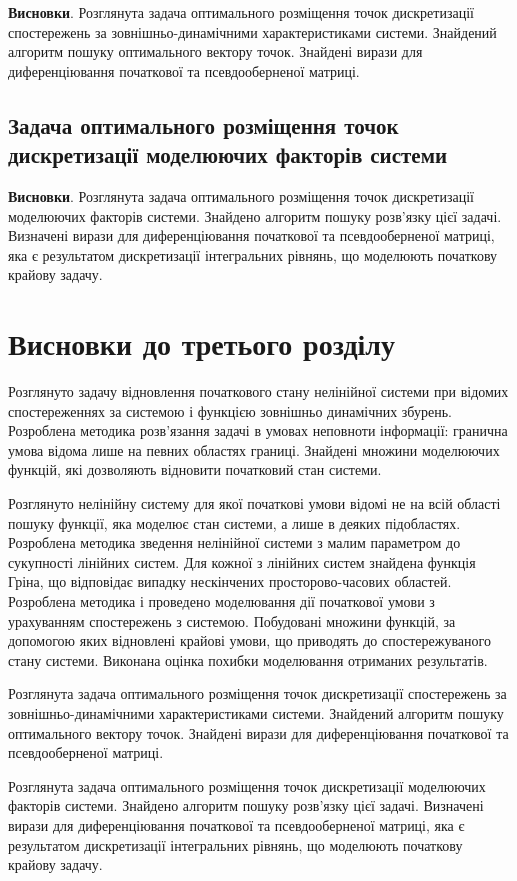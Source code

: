 \textbf{Висновки}. Розглянута задача оптимального розміщення  точок дискретизації спостережень за
зовнішньо-динамічними характеристиками системи. Знайдений алгоритм пошуку оптимального вектору точок.
Знайдені вирази для диференціювання початкової та псевдооберненої матриці.

\subsection{Задача оптимального розміщення  точок дискретизації моделюючих факторів системи} \label{sect3_2_2}

\textbf{Висновки}. Розглянута задача оптимального розміщення точок дискретизації моделюючих факторів системи.
Знайдено алгоритм пошуку розв’язку цієї задачі. Визначені вирази для диференціювання початкової та
псевдооберненої матриці, яка є результатом дискретизації інтегральних рівнянь, що моделюють початкову крайову задачу.

\section*{Висновки до третього розділу}

Розглянуто задачу відновлення початкового стану нелінійної системи при відомих спостереженнях за системою і функцією
зовнішньо динамічних збурень. Розроблена методика розв’язання задачі в умовах неповноти інформації: гранична умова
відома лише на певних областях границі. Знайдені множини моделюючих функцій, які дозволяють відновити початковий
стан системи.

Розглянуто нелінійну систему для якої початкові умови відомі не на всій області пошуку функції, яка моделює стан
системи, а лише в деяких підобластях. Розроблена методика зведення нелінійної системи з малим параметром до
сукупності лінійних систем. Для кожної з лінійних систем знайдена функція Гріна, що відповідає випадку нескінчених
просторово-часових областей. Розроблена методика і проведено моделювання дії початкової умови з урахуванням
спостережень з системою. Побудовані множини функцій, за допомогою яких відновлені крайові умови, що приводять
до спостережуваного стану системи. Виконана оцінка похибки моделювання отриманих результатів.

Розглянута задача оптимального розміщення  точок дискретизації спостережень за зовнішньо-динамічними характеристиками
системи. Знайдений алгоритм пошуку оптимального вектору точок. Знайдені вирази для диференціювання початкової та
псевдооберненої матриці.

Розглянута задача оптимального розміщення  точок дискретизації моделюючих факторів системи. Знайдено алгоритм
пошуку розв’язку цієї задачі. Визначені вирази для диференціювання початкової та псевдооберненої матриці, яка є
результатом дискретизації інтегральних рівнянь, що моделюють початкову крайову задачу.
